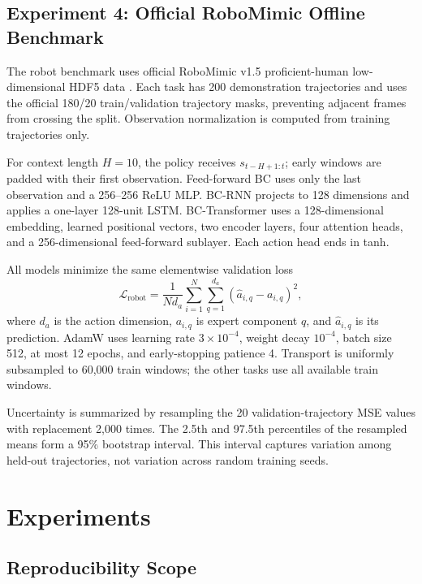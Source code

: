 \documentclass[10pt]{article}
\begin{document}
\subsection{Experiment 4: Official RoboMimic Offline Benchmark}

The robot benchmark uses official RoboMimic v1.5 proficient-human
low-dimensional HDF5 data \citep{mandlekar2022robomimic}. Each task has 200
demonstration trajectories and uses the official 180/20 train/validation
trajectory masks, preventing adjacent frames from crossing the split.
Observation normalization is computed from training trajectories only.

For context length $H=10$, the policy receives
$s_{t-H+1:t}$; early windows are padded with their first observation. Feed-forward
BC uses only the last observation and a 256--256 ReLU MLP. BC-RNN projects to
128 dimensions and applies a one-layer 128-unit LSTM. BC-Transformer uses a
128-dimensional embedding, learned positional vectors, two encoder layers, four
attention heads, and a 256-dimensional feed-forward sublayer. Each action head
ends in tanh.

All models minimize the same elementwise validation loss
\begin{equation}
  \mathcal{L}_{\mathrm{robot}}
  =\frac{1}{Nd_a}\sum_{i=1}^{N}
  \sum_{q=1}^{d_a}
  \left(\hat a_{i,q}-a_{i,q}\right)^2,
  \label{eq:robot-mse}
\end{equation}
where $d_a$ is the action dimension, $a_{i,q}$ is expert component $q$, and
$\hat a_{i,q}$ is its prediction. AdamW \citep{loshchilov2019adamw} uses
learning rate $3\times10^{-4}$, weight decay $10^{-4}$, batch size 512, at most
12 epochs, and early-stopping patience 4. Transport is uniformly subsampled to
60,000 train windows; the other tasks use all available train windows.

Uncertainty is summarized by resampling the 20 validation-trajectory MSE values
with replacement 2,000 times. The 2.5th and 97.5th percentiles of the resampled
means form a 95\% bootstrap interval. This interval captures variation among
held-out trajectories, not variation across random training seeds.

\section{Experiments}

\subsection{Reproducibility Scope}
\end{document}
